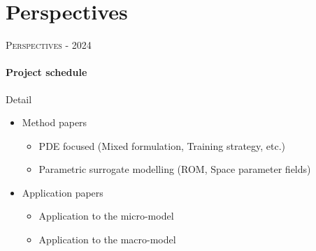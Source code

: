 \documentclass[aspectratio=1610, 10pt]{beamer}
\begin{document}
\section{Perspectives}
    \begin{frame}{\textsc{Perspectives - 2024}}
    \framesubtitle{Project schedule}
        \vspace{-5pt}
        \begin{center}
            
        \end{center}
        \vspace{-10pt}
        \begin{greenblockshadow}{Detail}
            \begin{minipage}{0.48\linewidth}
                \begin{itemize}
                \item Method papers
                \begin{itemize}
                    \item PDE focused (Mixed formulation, Training strategy, etc.)
                    \item Parametric surrogate modelling (ROM, Space parameter fields)
                \end{itemize}
                \end{itemize}
            \end{minipage}
            \hfill\vline\hfill
            \begin{minipage}{0.48\linewidth}
                \begin{itemize}
                \item Application papers
                \begin{itemize}
                    \item Application to the micro-model
                    \item Application to the macro-model
                \end{itemize}
                \end{itemize}
            \end{minipage}
        \end{greenblockshadow}
    \end{frame}
 
\end{document}
